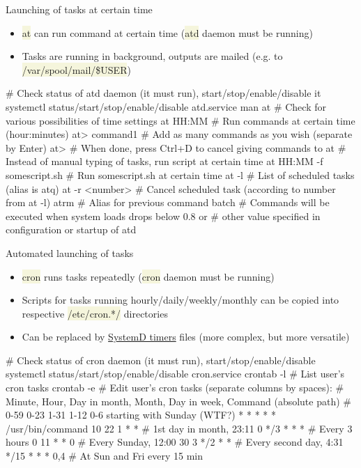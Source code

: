 \documentclass[compress, xelatex, 11pt, xcolor=svgnames, aspectratio=169,
	hyperref={
		bookmarks=true,
		unicode=true,
		colorlinks=true,
		pdftitle={Linux, command line and MetaCentrum},
		plainpages=false,
		pdfauthor={Vojtech Zeisek},
		pdfsubject={Course about use of Linux command line, writing shell scripts and using MetaCentrum of CESNET},
		pdfcreator={XeLaTeX},
		pdfkeywords={Linux, GNU, BASH, shell, command line, MetaCentrum},
		linkcolor=DarkRed, %
		anchorcolor=DarkBlue, %
		citecolor=Indigo, %
		filecolor=NavyBlue, %
		menucolor=DarkMagenta, %
		urlcolor=DarkBlue, %
		},
	url={hyphens, lowtilde} %
	]{beamer}
\renewcommand{\texttt}[1]{\colorbox{Beige}{{\ttfamily #1}}}
\begin{document}
\begin{frame}[fragile]{Launching of tasks at certain time}
	\begin{itemize}
		\item \texttt{at} can run command at certain time (\texttt{atd} daemon must be running)
		\item Tasks are running in background, outputs are mailed (e.g. to \texttt{/var/spool/mail/\$USER})
	\end{itemize}
	\vfill
	\begin{bashcode}
    # Check status of atd daemon (it must run), start/stop/enable/disable it
    systemctl status/start/stop/enable/disable atd.service
    man at # Check for various possibilities of time settings
    at HH:MM # Run commands at certain time (hour:minutes)
    at> command1 # Add as many commands as you wish (separate by Enter)
    at> # When done, press Ctrl+D to cancel giving commands to at
    # Instead of manual typing of tasks, run script at certain time
    at HH:MM -f somescript.sh # Run somescript.sh at certain time
    at -l # List of scheduled tasks (alias is atq)
    at -r <number> # Cancel scheduled task (according to number from at -l)
    atrm # Alias for previous command
    batch # Commands will be executed when system loads drops below 0.8 or
          # other value specified in configuration or startup of atd
	\end{bashcode}
\end{frame}

\begin{frame}[fragile]{Automated launching of tasks}
	\begin{itemize}
		\item \texttt{cron} runs tasks repeatedly (\texttt{cron} daemon must be running)
		\item Scripts for tasks running hourly/daily/weekly/monthly can be copied into respective \texttt{/etc/cron.*/} directories
		\item Can be replaced by \href{https://www.freedesktop.org/software/systemd/man/latest/systemd.timer.html}{SystemD timers} files (more complex, but more versatile)
	\end{itemize}
	\vfill
	\begin{bashcode}
    # Check status of cron daemon (it must run), start/stop/enable/disable
    systemctl status/start/stop/enable/disable cron.service
    crontab -l # List user's cron tasks
    crontab -e # Edit user's cron tasks (separate columns by spaces):
    # Minute, Hour, Day in month, Month, Day in week, Command (absolute path)
    # 0-59    0-23  1-31          1-12   0-6 starting with Sunday (WTF?)
      *       *     *             *      *            /usr/bin/command
      10      22    1             *      *    # 1st day in month, 23:11
      0       */3   *             *      *    # Every 3 hours
      0       11    *             *      0    # Every Sunday, 12:00
      30      3     */2           *      *    # Every second day, 4:31
      */15    *     *             *      0,4  # At Sun and Fri every 15 min
	\end{bashcode}
\end{frame}
\end{document}
